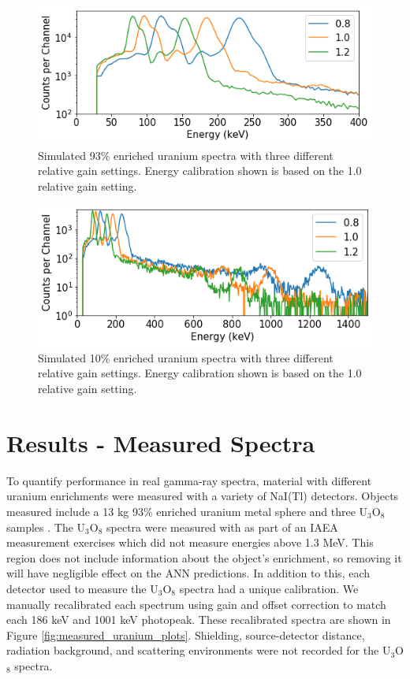 \begin{figure}[H]
	\centering
	\includegraphics[width=0.8\linewidth]{images/simulated_uranium_calibration.png}
	\caption{Simulated 93\% enriched uranium spectra with three different relative gain settings. Energy calibration shown is based on the 1.0 relative gain setting.}
	\label{fig:simulated_uranium_calibration_93pct}
\end{figure}

\begin{figure}[H]
	\centering
	\includegraphics[width=0.8\linewidth]{images/simulated_uranium_calibration_1500kev.png}
	\caption{Simulated 10\% enriched uranium spectra with three different relative gain settings. Energy calibration shown is based on the 1.0 relative gain setting.}
	\label{fig:simulated_uranium_calibration_10pct}
\end{figure}

\section{Results - Measured Spectra}

To quantify performance in real gamma-ray spectra, material with different uranium enrichments were measured with a variety of NaI(Tl) detectors. Objects measured include a 13 kg 93\% enriched uranium metal sphere \cite{Rothe1997} and three U$_{3}$O$_{8}$  samples \cite{jacobstinnett_u3o8}. The U$_{3}$O$_{8}$ spectra were measured with as part of an IAEA measurement exercises which did not measure energies above 1.3 MeV. This region does not include information about the object's enrichment, so removing it will have negligible effect on the ANN predictions. In addition to this, each detector used to measure the U$_{3}$O$_{8}$ spectra had a unique calibration. We manually recalibrated each spectrum using gain and offset correction to match each 186 keV and 1001 keV photopeak. These recalibrated spectra are shown in Figure \ref{fig:measured_uranium_plots}. Shielding, source-detector distance, radiation background, and scattering environments were not recorded for the U$_{3}$O$_{8}$ spectra.

